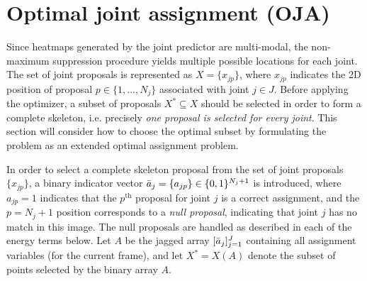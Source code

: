
\section{Optimal joint assignment (OJA)}\label{sec:qp}

Since heatmaps generated by the joint predictor are multi-modal, the non-maximum suppression procedure yields multiple possible locations for each joint. The set of joint proposals is represented as $X = \{x_{jp}\}$, where $x_{jp}$ indicates the 2D position of proposal $p \in \{1,...,N_j\}$ associated with joint $j \in J$.
Before applying the optimizer, a subset of proposals $X^* \subseteq X$ should be selected in order to form a complete skeleton, i.e. precisely \emph{one proposal is selected for every joint}. This section will consider how to choose the optimal subset by formulating the problem as an extended optimal assignment problem.

In order to select a complete skeleton proposal from the set of joint proposals $\{x_{jp}\}$, a binary indicator vector $\bar{a}_j = \{a_{jp}\} \in \{0, 1\}^{N_j+1}$ is introduced, where $a_{jp} = 1$ indicates that the $p^\text{th}$ proposal for joint $j$ is a correct assignment, and the $p = N_j+1$ position corresponds to a {\em null proposal}, indicating that joint $j$ has no match in this image.
The null proposals are handled as described in each of the energy terms below.
Let $A$ be the jagged array $[\bar{a}_j]_{j=1}^J$ containing all assignment variables (for the current frame), and let $X^* = X(A)$ denote the subset of points selected by the binary array $A$.


